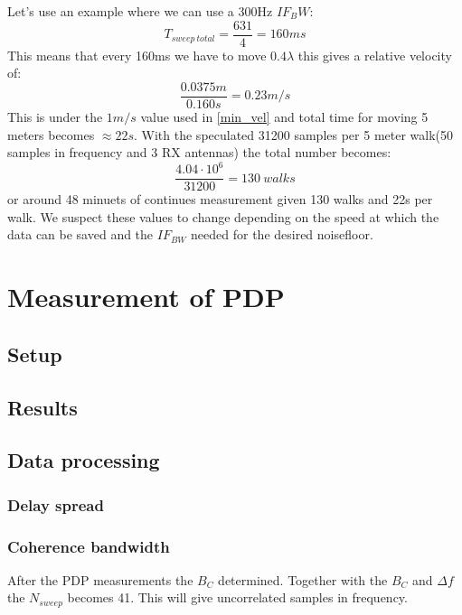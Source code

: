 Let's  use an example where we can use a 300Hz $IF_BW$:
\begin{equation}
T_{sweep \ total} = \frac{631}{4} = 160ms
\end{equation}
This means that every 160ms we have to move $0.4 \lambda$ this gives a relative velocity of:
\begin{equation}
\frac{0.0375m}{0.160s} = 0.23 m/s
\end{equation}
This is under the $1m/s$ value used in \autoref{min_vel}
and total time for moving 5 meters becomes $\approx 22s$.
With the speculated 31200 samples per 5 meter walk(50 samples in frequency and 3 RX antennas) the total number becomes:
\begin{equation}
\frac{4.04 \cdot 10^6}{31200} = 130 \ walks
\end{equation}
or around 48 minuets of continues measurement given 130 walks and 22s per walk. We suspect these values to change depending on the speed at which the data can be saved and the $IF_{BW}$ needed for the desired noisefloor.

\chapter{Measurement of PDP}
\section{Setup}
\section{Results}
\section{Data processing}
\subsection{Delay spread}

\subsection{Coherence bandwidth}\label{sec:coherence_bandwidth}
After the PDP measurements the $B_C$ determined. Together with the $B_C$ and $\Delta f$ the $N_{sweep}$ becomes 41. This will give uncorrelated samples in frequency.

